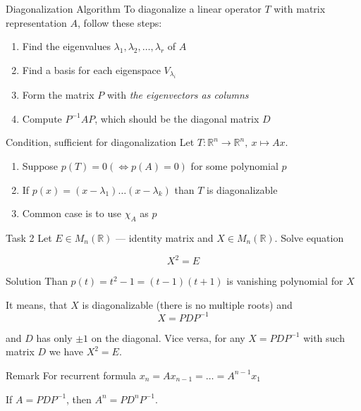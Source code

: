 \documentclass[fullscreen=true, bookmarks=true, hyperref={pdfencoding=unicode}]{beamer}
\begin{document}
\begin{frame}{Diagonalization Algorithm}
  To diagonalize a linear operator $T$ with matrix representation $A$, follow these steps:
  
  \begin{enumerate}
    \item Find the eigenvalues $\lambda_1, \lambda_2, \dots, \lambda_r$ of $A$
    \item Find a basis for each eigenspace $V_{\lambda_i}$
    \item Form the matrix $P$ with \emph{the eigenvectors as columns}
    \item Compute $P^{-1} A P$, which should be the diagonal matrix $D$
  \end{enumerate}
\end{frame}


\begin{frame}{Condition, sufficient for diagonalization}
  Let $T: \mathbb{R}^n \to \mathbb{R}^n,\ x \mapsto Ax$.
  
  \begin{enumerate}
    \item Suppose $p(T) = 0 (\Leftrightarrow  p(A) = 0)$ for some polynomial $p$
    \item If $p(x) = (x-\lambda_1)\dots (x-\lambda_k)$ than $T$ is diagonalizable
    \item Common case is to use $\chi_A$ as $p$
  \end{enumerate}
\end{frame}


\begin{frame}{Task 2}
  Let $E \in {M}_n (\mathbb{R})$ — identity matrix and $X \in {M}_n (\mathbb{R})$. Solve equation 

  $$X^2 = E$$
  \pause

  \begin{block}{Solution}
    Than $p(t) = t^2 - 1 = (t-1)(t+1)$ is vanishing polynomial for $X$

    It means, that $X$ is diagonalizable (there is no multiple roots) 
    and $$X = PDP^{-1}$$

    and $D$ has only $\pm 1$ on the diagonal. Vice versa, 
    for any $X = PDP^{-1}$ with such matrix $D$ we have $X^2 = E$.
  \end{block}

  \pause
  \begin{block}{Remark}
    For recurrent formula
    $ x_n = Ax_{n-1} = \dots = A^{n-1}x_1 $
  
    If $A=PDP^{-1}$, then $A^n=PD^nP^{-1}$.
  \end{block}
\end{frame}
\end{document}

